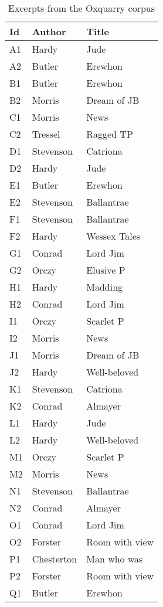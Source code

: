 \twocolumn
\begin{table}
  \caption{Excerpts from the Oxquarry corpus}
  \label{tbl:oxquarry_corpus}
  \begin{tabular}{l l l}
    \toprule
    \textbf{Id} &
    \textbf{Author} &
    \textbf{Title} \\
    \midrule
    A1 & Hardy & Jude \\
    A2 & Butler & Erewhon \\
    B1 & Butler & Erewhon \\
    B2 & Morris & Dream of JB \\
    C1 & Morris & News \\
    C2 & Tressel & Ragged TP \\
    D1 & Stevenson & Catriona \\
    D2 & Hardy & Jude \\
    E1 & Butler & Erewhon \\
    E2 & Stevenson & Ballantrae \\
    F1 & Stevenson & Ballantrae \\
    F2 & Hardy & Wessex Tales \\
    G1 & Conrad & Lord Jim \\
    G2 & Orczy & Elusive P \\
    H1 & Hardy & Madding \\
    H2 & Conrad & Lord Jim \\
    I1 & Orczy & Scarlet P \\
    I2 & Morris & News \\
    J1 & Morris & Dream of JB \\
    J2 & Hardy & Well-beloved \\
    K1 & Stevenson & Catriona \\
    K2 & Conrad & Almayer \\
    L1 & Hardy & Jude \\
    L2 & Hardy & Well-beloved \\
    M1 & Orczy & Scarlet P \\
    M2 & Morris & News \\
    N1 & Stevenson & Ballantrae \\
    N2 & Conrad & Almayer \\
    O1 & Conrad & Lord Jim \\
    O2 & Forster & Room with view \\
    P1 & Chesterton & Man who was \\
    P2 & Forster & Room with view \\
    Q1 & Butler & Erewhon \\

\end{tabular}
\end{table}

